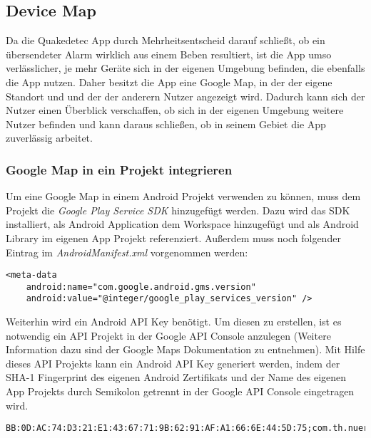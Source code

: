 \newpage
\subsection{Device Map}
\nocite{GoogleMapsAPI}
Da die Quakedetec App durch Mehrheitsentscheid darauf schließt, ob ein übersendeter Alarm wirklich aus einem Beben resultiert, ist die App umso verlässlicher, je mehr Geräte sich in der eigenen Umgebung befinden, die ebenfalls die App nutzen. Daher besitzt die App eine Google Map, in der der eigene Standort und und der der anderern Nutzer angezeigt wird. Dadurch kann sich der Nutzer einen Überblick verschaffen, ob sich in der eigenen Umgebung weitere Nutzer befinden und kann daraus schließen, ob in seinem Gebiet die App zuverlässig arbeitet.

\subsubsection{Google Map in ein Projekt integrieren}
Um eine Google Map in einem Android Projekt verwenden zu können, muss dem Projekt die \textit{Google Play Service SDK} hinzugefügt werden. Dazu wird das SDK installiert, als Android Application dem Workspace hinzugefügt und als Android Library im eigenen App Projekt referenziert. Außerdem muss noch folgender Eintrag im \textit{AndroidManifest.xml} vorgenommen werden:
\bigskip
\begin{lstlisting}[caption={Google Map AndroidManifest.xml Eintrag},label=lst:MapInsertManifest]
<meta-data
    android:name="com.google.android.gms.version"
    android:value="@integer/google_play_services_version" />
\end{lstlisting}
\par\bigskip
Weiterhin wird ein Android API Key benötigt. Um diesen zu erstellen, ist es notwendig ein API Projekt in der Google API Console anzulegen (Weitere Information dazu sind der Google Maps Dokumentation zu entnehmen). Mit Hilfe dieses API Projekts kann ein Android API Key generiert werden, indem der SHA-1 Fingerprint des eigenen Android Zertifikats und der Name des eigenen App Projekts durch Semikolon getrennt in der Google API Console eingetragen wird.
\bigskip
\begin{lstlisting}[caption={Android API Key generieren},label=lst:AndroidApiKey, basicstyle=\small]
BB:0D:AC:74:D3:21:E1:43:67:71:9B:62:91:AF:A1:66:6E:44:5D:75;com.th.nuernberg.itp.earthquakedetection
\end{lstlisting}

\newpage


